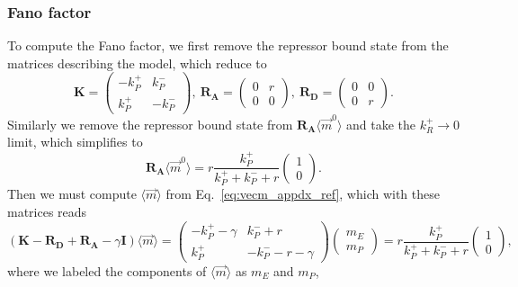 \subsubsection{Fano factor}
To compute the Fano factor, we first remove the repressor bound state from the
matrices describing the model, which reduce to
\begin{equation}
\mathbf{K} = \begin{pmatrix}
                -k_P^+ & k_P^- \\
                 k_P^+ &-k_P^- 
                \end{pmatrix},\
\mathbf{R_A} = \begin{pmatrix}
                0 & r \\ 
                0 & 0
                \end{pmatrix},\
\mathbf{R_D} = \begin{pmatrix}
                0 & 0 \\ 
                0 & r
                \end{pmatrix}.    
\end{equation}
Similarly we remove the repressor bound state from $\mathbf{R_A}
\langle\vec{m}^0\rangle$ and take the $k_R^+\rightarrow 0$ limit, which
simplifies to 
\begin{equation}
\mathbf{R_A} \langle\vec{m}^0\rangle
= r \frac{k_P^+ } {k_P^+ + k_P^- + r}
\begin{pmatrix} 1 \\ 0 \end{pmatrix}.
\end{equation}
Then we must compute $\langle\vec{m}\rangle$ from Eq.~\ref{eq:vecm_appdx_ref},
which with these matrices reads
\begin{equation}
(\mathbf{K} - \mathbf{R_D} + \mathbf{R_A} - \gamma\mathbf{I})
    \langle\vec{m}\rangle
= \begin{pmatrix}
    -k_P^+ -\gamma & k_P^- + r\\
    k_P^+          &-k_P^- - r - \gamma
    \end{pmatrix}
    \begin{pmatrix} m_E \\ m_P \end{pmatrix}
= r \frac{k_P^+ } {k_P^+ + k_P^- + r}
    \begin{pmatrix} 1 \\ 0 \end{pmatrix},
\end{equation}
where we labeled the components of $\langle\vec{m}\rangle$ as $m_E$ and $m_P$,
